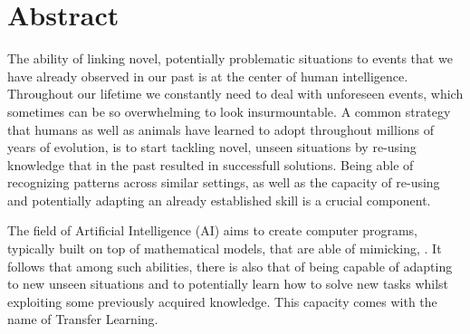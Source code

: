 


\begingroup
\let\clearpage\relax
\let\cleardoublepage\relax
\let\cleardoublepage\relax

\chapter*{Abstract}

The ability of linking novel, potentially problematic situations to events that we have already observed in our past is at the center of human intelligence. Throughout our lifetime we constantly need to deal with unforeseen events, which sometimes can be so overwhelming to look insurmountable. A common strategy that humans as well as animals have learned to adopt throughout millions of years of evolution, is to start tackling novel, unseen situations by re-using knowledge that in the past resulted in successfull solutions. Being able of recognizing patterns across similar settings, as well as the capacity of re-using and potentially adapting an already established skill is a crucial component. 

The field of Artificial Intelligence (AI) aims to create computer programs, typically built on top of mathematical models, that are able of mimicking, . It follows that among such abilities, there is also that of being capable of adapting to new unseen situations and to potentially learn how to solve new tasks whilst exploiting some previously acquired knowledge. This capacity comes with the name of Transfer Learning. 




\endgroup			

\vfill
